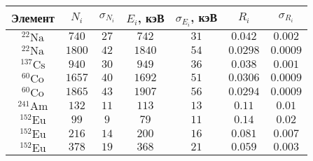 \begin{tabular}{| c | c | c | c | c | c | c |}
\hline
Элемент & $N_i$ & $\sigma_{N_i}$ & $E_i$, кэВ & $\sigma_{E_i}$, кэВ & $R_i$ & $\sigma_{R_i}$\\
\hline
$^{22}\text{Na}$ & $740$ & $27$ & $742$ & $31$ & $0.042$ & $0.002$\\
\hline
$^{22}\text{Na}$ & $1800$ & $42$ & $1840$ & $54$ & $0.0298$ & $0.0009$\\
\hline
$^{137}\text{Cs}$ & $940$ & $30$ & $949$ & $36$ & $0.038$ & $0.001$\\
\hline
$^{60}\text{Co}$ & $1657$ & $40$ & $1692$ & $51$ & $0.0306$ & $0.0009$\\
\hline
$^{60}\text{Co}$ & $1865$ & $43$ & $1907$ & $56$ & $0.0294$ & $0.0009$\\
\hline
$^{241}\text{Am}$ & $132$ & $11$ & $113$ & $13$ & $0.11$ & $0.01$\\
\hline
$^{152}\text{Eu}$ & $99$ & $9$ & $79$ & $11$ & $0.14$ & $0.02$\\
\hline
$^{152}\text{Eu}$ & $216$ & $14$ & $200$ & $16$ & $0.081$ & $0.007$\\
\hline
$^{152}\text{Eu}$ & $378$ & $19$ & $368$ & $21$ & $0.059$ & $0.003$\\
\hline
\end{tabular}
